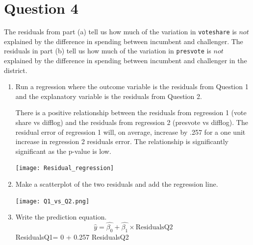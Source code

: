 \documentclass[12pt,letterpaper]{article}
\begin{document}
\section*{Question 4}
\noindent The residuals from part (a) tell us how much of the variation in \texttt{voteshare} is $not$ explained by the difference in spending between incumbent and challenger. The residuals in part (b) tell us how much of the variation in \texttt{presvote} is $not$ explained by the difference in spending between incumbent and challenger in the district.
	\begin{enumerate}
		\item Run a regression where the outcome variable is the residuals from Question 1 and the explanatory variable is the residuals from Question 2.	\vspace{.25cm}
		
		There is a positive relationship between the residuals from regression 1 (vote share vs difflog) and the residuals from regression 2 (presvote vs difflog). The residual error of regression 1 will, on average, increase by .257 for a one unit increase in regression 2 residuals error. The relationship is significantly significant as the p-value is low. 
		
		
		
		\texttt{[image: Residual\_regression]}

		
		\item Make a scatterplot of the two residuals and add the regression line. 	\vspace{6cm}
		
			\texttt{[image: Q1\_vs\_Q2.png]}
		
		
		\item Write the prediction equation.
			$$\hat{y}= \hat{\beta_0} + \hat{\beta_1} \times \text{ResidualsQ2}$$
		ResidualsQ1= 0 + 0.257 ResidualsQ2
		
	\end{enumerate}
	
	\newpage	
\end{document}
